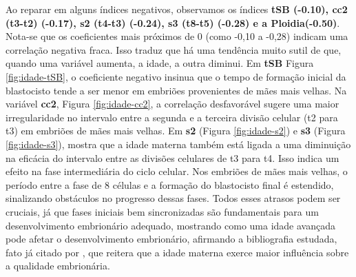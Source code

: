 Ao reparar em alguns índices negativos, observamos os índices \textbf{tSB (-0.10), cc2 (t3-t2) (-0.17), s2 (t4-t3) (-0.24),  s3 (t8-t5) (-0.28) e a Ploidia(-0.50)}. Nota-se que os coeficientes mais próximos de 0 (como -0,10 a -0,28) indicam uma correlação negativa fraca. Isso traduz que há uma tendência muito sutil de que, quando uma variável aumenta, a idade, a outra diminui. Em \textbf{tSB} Figura \ref{fig:idade-tSB}, o coeficiente negativo insinua que o tempo de formação inicial da blastocisto tende a ser menor em embriões provenientes de mães mais velhas. Na variável \textbf{cc2}, Figura \ref{fig:idade-cc2}, a correlação desfavorável sugere uma maior irregularidade no intervalo entre a segunda e a terceira divisão celular (t2 para t3) em embriões de mães mais velhas. Em \textbf{s2} (Figura \ref{fig:idade-s2}) e \textbf{s3} (Figura \ref{fig:idade-s3}), mostra que a idade materna também está ligada a uma diminuição na eficácia do intervalo entre as divisões celulares de t3 para t4. Isso indica um efeito na fase intermediária do ciclo celular. Nos embriões de mães mais velhas, o período entre a fase de 8 células e a formação do blastocisto final é estendido, sinalizando obstáculos no progresso dessas fases. Todos esses atrasos podem ser cruciais, já que fases iniciais bem sincronizadas são fundamentais para um desenvolvimento embrionário adequado, mostrando como uma idade avançada pode afetar o desenvolvimento embrionário, afirmando a bibliografia estudada, fato já citado por , que reitera que a idade materna exerce maior influência sobre a qualidade embrionária.

